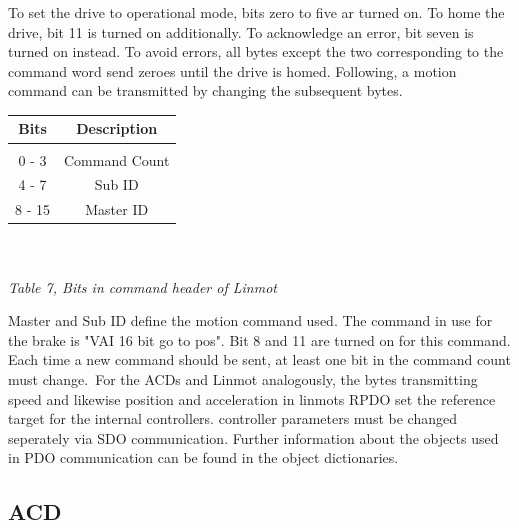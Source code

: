 To set the drive to operational mode, bits zero to five ar turned on.
To home the drive, bit 11 is turned on additionally. To acknowledge an error, bit seven is turned on instead. To avoid errors, all bytes except the two corresponding to the command word send zeroes until the drive is homed. Following, a motion command can be transmitted by changing the subsequent bytes.

\begin{tabular}{|c|c|}
	\hline 
	Bits & Description \\ 
	\hline 
	&   \\ 
	\hline 
	0 - 3 &  Command Count\\ 
	\hline 
	4 - 7 & Sub ID\\ 
	\hline 
	8 - 15 & Master ID\\ 
	\hline 
\end{tabular} 
\\
\\
\textit{Table 7, Bits in command header of Linmot}

Master and Sub ID define the motion command used. The command in use for the brake is "VAI 16 bit go to pos". Bit 8 and 11 are turned on for this command. Each time a new command should be sent, at least one bit in the command count must change.\
For the ACDs and Linmot analogously, the bytes transmitting speed and likewise position and acceleration in linmots RPDO set the reference target for the internal controllers. controller parameters must be changed seperately via SDO communication. Further information about the objects used in PDO communication can be found in the object dictionaries.

\subsection{ACD}




